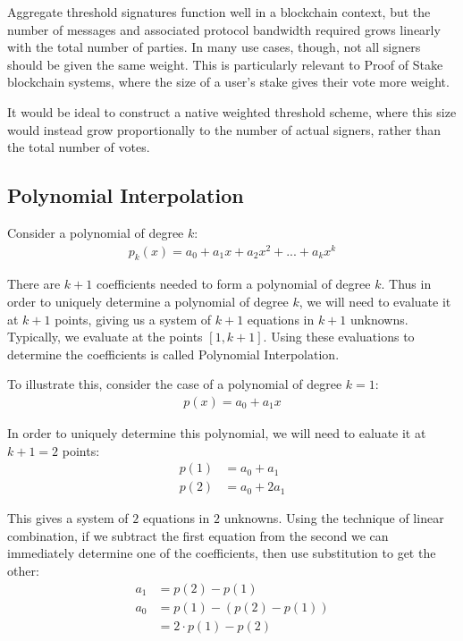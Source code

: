 \documentclass{article}
\begin{document}
Aggregate threshold signatures function well in a blockchain context, but the number of messages and associated protocol bandwidth required grows linearly with the total number of parties.  In many use cases, though, not all signers should be given the same weight.  This is particularly relevant to Proof of Stake blockchain systems, where the size of a user's stake gives their vote more weight.

It would be ideal to construct a native weighted threshold scheme, where this size would instead grow proportionally to the number of actual signers, rather than the total number of votes.  

\subsection{
  Polynomial Interpolation
}

Consider a polynomial of degree $k$:
\begin{align}
  p_k(x) = a_0 + a_1 x + a_2 x^2 + ... + a_k x^k
\end{align}

There are $k+1$ coefficients needed to form a polynomial of degree $k$.  Thus in order to uniquely determine a polynomial of degree $k$, we will need to evaluate it at $k+1$ points, giving us a system of $k+1$ equations in $k+1$ unknowns.  Typically, we evaluate at the points $[1, k+1]$.  Using these evaluations to determine the coefficients is called Polynomial Interpolation.

To illustrate this, consider the case of a polynomial of degree $k = 1$:
\begin{align}
  p(x) = a_0 + a_1 x\nonumber
\end{align}

In order to uniquely determine this polynomial, we will need to ealuate it at $k+1 = 2$ points:
\begin{align}
  p(1) &= a_0 + a_1\nonumber\\
  p(2) &= a_0 + 2 a_1\nonumber
\end{align}

This gives a system of $2$ equations in $2$ unknowns.  Using the technique of linear combination, if we subtract the first equation from the second we can immediately determine one of the coefficients, then use substitution to get the other:
\begin{align}
  a_1 &= p(2) - p(1)\nonumber\\
  a_0 &= p(1) - (p(2) - p(1))\nonumber\\
      &= 2 \cdot p(1) - p(2)\nonumber
\end{align}
\end{document}

